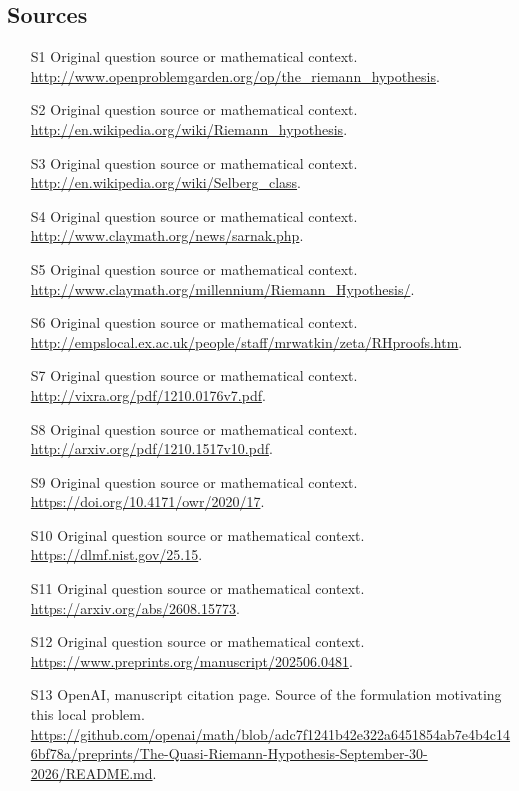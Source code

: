 \documentclass[11pt]{article}
\begin{document}
\subsection{Sources}
\begin{itemize}
\item[S1] Original question source or mathematical context.
\url{http://www.openproblemgarden.org/op/the_riemann_hypothesis}.
\item[S2] Original question source or mathematical context.
\url{http://en.wikipedia.org/wiki/Riemann_hypothesis}.
\item[S3] Original question source or mathematical context.
\url{http://en.wikipedia.org/wiki/Selberg_class}.
\item[S4] Original question source or mathematical context.
\url{http://www.claymath.org/news/sarnak.php}.
\item[S5] Original question source or mathematical context.
\url{http://www.claymath.org/millennium/Riemann_Hypothesis/}.
\item[S6] Original question source or mathematical context.
\url{http://empslocal.ex.ac.uk/people/staff/mrwatkin/zeta/RHproofs.htm}.
\item[S7] Original question source or mathematical context.
\url{http://vixra.org/pdf/1210.0176v7.pdf}.
\item[S8] Original question source or mathematical context.
\url{http://arxiv.org/pdf/1210.1517v10.pdf}.
\item[S9] Original question source or mathematical context.
\url{https://doi.org/10.4171/owr/2020/17}.
\item[S10] Original question source or mathematical context.
\url{https://dlmf.nist.gov/25.15}.
\item[S11] Original question source or mathematical context.
\url{https://arxiv.org/abs/2608.15773}.
\item[S12] Original question source or mathematical context.
\url{https://www.preprints.org/manuscript/202506.0481}.
\item[S13] OpenAI, manuscript citation page. Source of the formulation motivating this local problem.
\url{https://github.com/openai/math/blob/adc7f1241b42e322a6451854ab7e4b4c146bf78a/preprints/The-Quasi-Riemann-Hypothesis-September-30-2026/README.md}.
\end{itemize}
\end{document}

